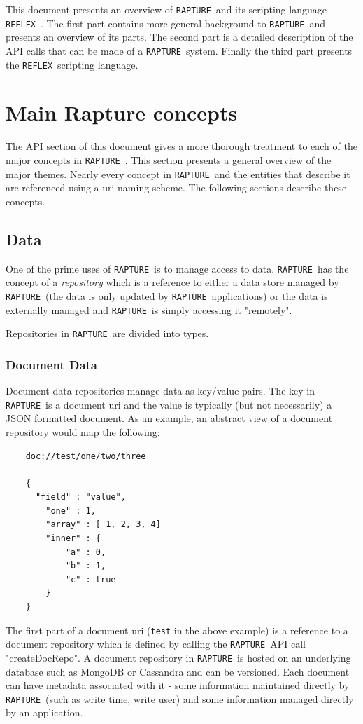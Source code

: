 \documentclass[12pt,twoside,a4paper]{book}
\newcommand{\Rapture}{\Verb+RAPTURE+~}
\newcommand{\Reflex}{\Verb+REFLEX+~}
\begin{document}
This document presents an overview of \Rapture and its scripting language \Reflex. The first
part contains more general background to \Rapture and presents an overview of its parts. The second
part is a detailed description of the API calls that can be made of a \Rapture system. Finally the third
part presents the \Reflex scripting language.

\chapter{Main Rapture concepts}

The API section of this document gives a more thorough treatment to each of the major concepts in \Rapture. This section
presents a general overview of the major themes. Nearly every concept in \Rapture and the entities that describe it are
referenced using a uri naming scheme. The following sections describe these concepts.

\section{Data}
One of the prime uses of \Rapture is to manage access to data. \Rapture has the concept of a \emph{repository} which is a
reference to either a data store managed by \Rapture (the data is only updated by \Rapture applications) or
the data is externally managed and \Rapture is simply accessing it "remotely".

Repositories in \Rapture are divided into types.

\subsection{Document Data}
Document data repositories manage data as key/value pairs. The key in \Rapture is a document uri and the value
is typically (but not necessarily) a JSON formatted document. As an example, an abstract view of a document repository would map the following:

\begin{Verbatim}
	doc://test/one/two/three

	{
	  "field" : "value",
		"one" : 1,
		"array" : [ 1, 2, 3, 4]
		"inner" : {
			"a" : 0,
			"b" : 1,
			"c" : true
		}
	}
\end{Verbatim}

The first part of a document uri (\Verb+test+ in the above example) is a reference to a
document repository which is defined by calling the \Rapture API call "createDocRepo". A
document repository in \Rapture is hosted on an underlying database such as MongoDB or Cassandra
and can be versioned. Each document can have metadata associated with it - some information maintained
directly by \Rapture (such as write time, write user) and some information managed directly by
an application.
\end{document}
